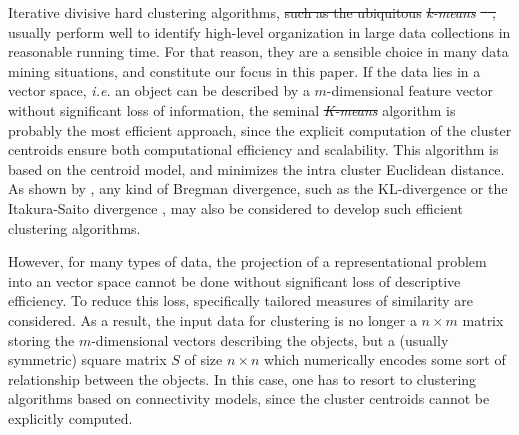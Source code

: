 \documentclass[natbib,smallextended]{svjour3}
\providecommand{\DIFaddtex}[1]{{\protect\color{blue}\uwave{#1}}} %
\providecommand{\DIFdeltex}[1]{{\protect\color{red}\sout{#1}}}                      %
\providecommand{\DIFaddbegin}{} %
\providecommand{\DIFaddend}{} %
\providecommand{\DIFdelbegin}{} %
\providecommand{\DIFdelend}{} %
\providecommand{\DIFadd}[1]{\texorpdfstring{\DIFaddtex{#1}}{#1}} %
\providecommand{\DIFdel}[1]{\texorpdfstring{\DIFdeltex{#1}}{}} %
\begin{document}
Iterative divisive hard clustering algorithms, \DIFdelbegin \DIFdel{such as the ubiquitous }\emph{\DIFdel{k-means}} %
\DIFdel{\mbox{%
\citep{macQueenBsmsp67}}%
, }\DIFdelend usually perform well to identify high-level organization in large data collections in reasonable running time. For that reason, they are a sensible choice in many data mining situations, and constitute our focus in this paper.
If the data lies in a vector space, \textit{i.e.} an object can be described by a $m$-dimensional feature vector without significant loss of information, the seminal \emph{\DIFdelbegin \DIFdel{K-means}\DIFdelend \DIFaddbegin \DIFadd{k-means}\DIFaddend } algorithm \citep{macQueenBsmsp67} is probably the most efficient approach, since the explicit computation of the cluster centroids ensure both computational efficiency and scalability. This algorithm is  based on the centroid model, and minimizes the intra cluster Euclidean distance. As shown by \citet{Banerjee:2005:CBD:1046920.1194902}, any kind of Bregman divergence, such as the KL-divergence \citep{Dhillon:2003:DIT:944919.944973} or the Itakura-Saito divergence \citep{linde:algorithm}, may also be considered to develop such efficient clustering algorithms.

However, for many types of data, the projection of a representational problem into an vector space cannot be done without significant loss of descriptive efficiency. To reduce this loss, specifically tailored measures of similarity are considered. As a result, the input data for clustering is no longer a $n \times m$ matrix storing the $m$-dimensional vectors describing the objects, but a (usually symmetric) square matrix $S$ of size $n \times n$ which numerically encodes some sort of relationship between the objects. In this case, one has to resort to clustering algorithms based on connectivity models, since the cluster centroids cannot be explicitly computed.
\end{document}
